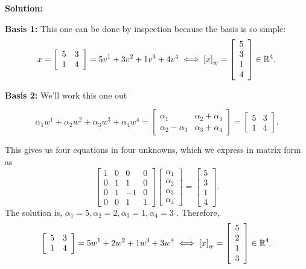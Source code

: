     \textbf{Solution:} 
  
  \vspace*{.2cm}
  
\textbf{Basis 1:} This one can be done by inspection because the basis is so simple:
                $$x=\left[\begin{array}{rr}
        5 & 3\\
        1 & 4
        \end{array}\right]=5v^{1}+3v^{2}+1v^{3}+4v^{4} \iff \left[x\right]_w=\left[\begin{array}{c}
        5\\
        3\\
        1\\
        4
    \end{array}\right]\in \mathbb R^4.$$
  
  \textbf{Basis 2:} We'll work this one out
  
  $$\alpha_1 w^{1}+ \alpha_2 w^{2}+ \alpha_3w^{3}+ \alpha_4w^{4} = \left[\begin{array}{rr}
        \alpha_1 & \alpha_2  + \alpha_3\\
        \alpha_2  - \alpha_3 & \alpha_3  + \alpha_4
        \end{array}\right]= \left[\begin{array}{rr}
        5 & 3\\
        1 & 4
        \end{array}\right].$$
        
        This gives us four equations in four unknowns, which we express in matrix form as
        $$
        \left[\begin{array}{rrrr}
        1 & 0 & 0 & 0\\
       0 & 1 & 1 & 0\\
       0 & 1 & -1 & 0\\
       0 & 0 & 1 & 1
        \end{array}\right] 
        \left[\begin{array}{c}
   \alpha_1 \\ \alpha_2 \\ \alpha_3 \\ \alpha_4
        \end{array}\right] =
        \left[\begin{array}{c}
   5 \\ 3 \\ 1\\ 4
        \end{array}\right].
        $$
  The solution is, $ \alpha_1 = 5, \alpha_2= 2,  \alpha_3 = 1,  \alpha_4 = 3 $ . Therefore, 
    $$\left[\begin{array}{rr}
        5 & 3\\
        1 & 4
        \end{array}\right]
         =5w^{1}+2w^{2}+1w^{3}+3w^{4} \iff \left[x\right]_w=\left[\begin{array}{r}
        5\\
        2\\
        1\\
        3
    \end{array}\right]\in \mathbb R^4.$$
    
